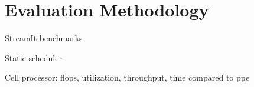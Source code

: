 \section{Evaluation Methodology}

StreamIt benchmarks

Static scheduler

Cell processor: flops, utilization, throughput, time compared to ppe


